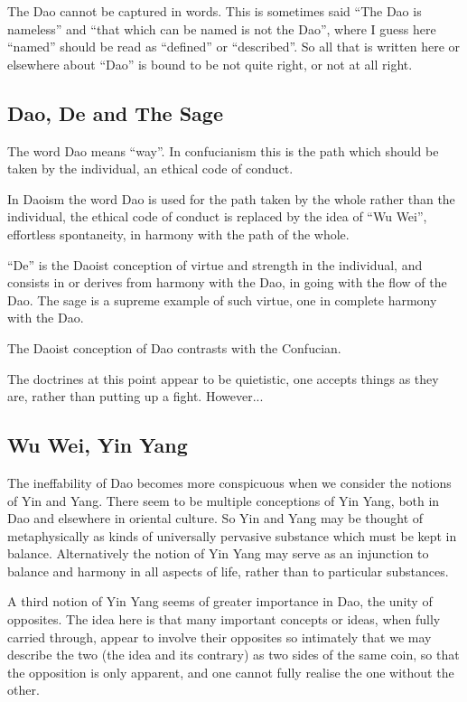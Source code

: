 \documentclass[10pt,titlepage]{article}
\begin{document}
The Dao cannot be captured in words.
This is sometimes said ``The Dao is nameless'' and ``that which can be named is not the Dao'', where I guess here ``named'' should be read as ``defined'' or ``described''.
So all that is written here or elsewhere about ``Dao'' is bound to be not quite right, or not at all right.

\subsection{Dao, De and The Sage}

The word Dao means ``way''.
In confucianism this is the path which should be taken by the individual, an ethical code of conduct.

In Daoism the word Dao is used for the path taken by the whole rather than the individual, the ethical code of conduct is replaced by the idea of ``Wu Wei'', effortless spontaneity, in harmony with the path of the whole.  

``De'' is the Daoist conception of virtue and strength in the individual, and consists in or derives from harmony with the Dao, in going with the flow of the Dao.
The sage is a supreme example of such virtue, one in complete harmony with the Dao.

The Daoist conception of Dao contrasts with the Confucian.

The doctrines at this point appear to be quietistic, one accepts things as they are, rather than putting up a fight.
However...

\subsection{Wu Wei, Yin Yang}

The ineffability of Dao becomes more conspicuous when we consider the notions of Yin and Yang.
There seem to be multiple conceptions of Yin Yang, both in Dao and elsewhere in oriental culture.
So Yin and Yang may be thought of metaphysically as kinds of universally pervasive substance which must be kept in balance.
Alternatively the notion of Yin Yang may serve as an injunction to balance and harmony in all aspects of life, rather than to particular substances.

A third notion of Yin Yang seems of greater importance in Dao, the unity of opposites.
The idea here is that many important concepts or ideas, when fully carried through, appear to involve their opposites so intimately that we may describe the two (the idea and its contrary) as two sides of the same coin, so that the opposition is only apparent, and one cannot fully realise the one without the other.
\end{document}
